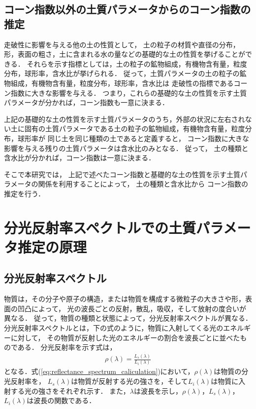 \subsection{コーン指数以外の土質パラメータからのコーン指数の推定}
\label{ssec:ConeindexEstimation}

走破性に影響を与える他の土の性質として，%
土の粒子の材質や直径の分布，形，表面の粗さ，土に含まれる水の量などの基礎的な土の性質を挙げることができる\cite{小田1971}\cite{Okello1991}\cite{Shoop1993}\cite{Flores2014}．
それらを示す指標としては，土の粒子の鉱物組成，有機物含有量，粒度分布，球形率，含水比が挙げられる．%
従って，土質パラメータの土の粒子の鉱物組成，有機物含有量，粒度分布，球形率，含水比は
走破性の指標であるコーン指数に大きな影響を与える\cite{Collins1971}．%
つまり，これらの基礎的な土の性質を示す土質パラメータが分かれば，コーン指数も一意に決まる\cite{Ayers1982}\cite{Jenkins1985}\cite{Elbanna1987}\cite{Mulhearn2001}．

上記の基礎的な土の性質を示す土質パラメータのうち，外部の状況に左右されない土に固有の土質パラメータである土の粒子の鉱物組成，有機物含有量，粒度分布，球形率が
同じ土を同じ種類の土であると定義すると，
コーン指数に大きな影響を与える残りの土質パラメータは含水比のみとなる．
従って，
土の種類と含水比が分かれば，コーン指数は一意に決まる．

そこで本研究では，
上記で述べたコーン指数と基礎的な土の性質を示す土質パラメータの関係を利用することによって，
土の種類と含水比から
コーン指数の推定を行う．

\clearpage


\section{分光反射率スペクトルでの土質パラメータ推定の原理}
\label{sec:SpectrumAndMaterialRelationship}

\subsection{分光反射率スペクトル}
\label{ssec:Spectrum}

物質は，その分子や原子の構造，または物質を構成する微粒子の大きさや形，表面の凹凸によって，
光の波長ごとの反射，散乱，吸収，そして放射の度合いが異なる\cite{Shaw2002}\cite{Shaw2003}．
従って，物質の種類と状態によって，分光反射率スペクトルが異なる．
分光反射率スペクトルとは，下の式のように，物質に入射してくる光のエネルギーに対して，
その物質が反射した光のエネルギーの割合を波長ごとに並べたものである．%
分光反射率を示す式は，
\begin{eqnarray}
\rho(\lambda) = \frac{L_s(\lambda)}{L_i(\lambda)}\label{eq:reflectance_spectrum_caliculation}
\end{eqnarray}
となる．\mbox{式(\ref{eq:reflectance_spectrum_caliculation})}において，$\rho(\lambda)$は物質の分光反射率を，
$L_s(\lambda)$は物質が反射する光の強さを，そして$L_i(\lambda)$は物質に入射する光の強さをそれぞれ示す．
また，$\lambda$は波長を示し，$\rho(\lambda)$，$L_s(\lambda)$，$L_i(\lambda)$は波長の関数である．

